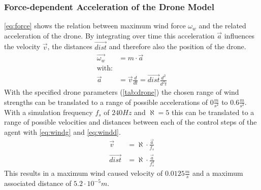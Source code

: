 \subsubsection*{Force-dependent Acceleration of the Drone Model}
\cref{eq:force} shows the relation between maximum wind force $\omega_w$ and the related acceleration
of the drone. By integrating over time this acceleration $\overrightarrow{a}$ influences 
the velocity $\overrightarrow{v}$, the distances $\overrightarrow{dist}$ and therefore also 
the position of the drone.
\begin{align}
	\overrightarrow{\omega_w} &= m \cdot \overrightarrow{a} \label{eq:force}\\
	\text{with:} &\nonumber\\
	\overrightarrow{a} &= \overrightarrow{v} \frac{d}{dt} = \overrightarrow{dist} \frac{d^2}{d^2t}
\end{align}
With the specified drone parameters (\cref{tab:drone}) the chosen range of wind strengths can 
be translated to a range of possible accelerations of $0 \frac{m}{s^2}$ to $0.6 \frac{m}{s^2}$.
With a simulation frequency $f_s$ of $240Hz$ and $\aleph = 5$ this can be translated to a range
of possible velocities and distances between each of the control steps of the agent with \cref{eq:windg} 
and \cref{eq:windd}.
\begin{align}
	\overrightarrow{v} &= \aleph \cdot \frac{\overrightarrow{a}}{f_s} \label{eq:windg}\\
	\overrightarrow{dist} &= \aleph \cdot \frac{\overrightarrow{a}}{f_s^2} \label{eq:windd}
\end{align}
This results in a maximum wind caused velocity of $0.0125 \frac{m}{s}$ and a maximum
associated distance of $5.2 \cdot 10^{-5} m$.


\newpage

